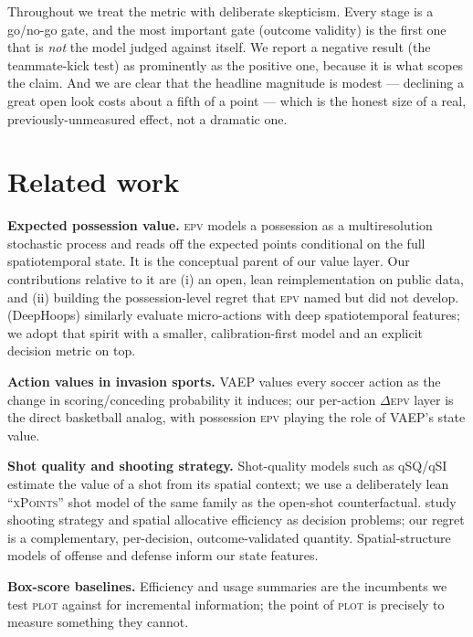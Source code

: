 \documentclass[11pt]{article}
\newcommand{\plot}{\textsc{plot}}
\newcommand{\epv}{\textsc{epv}}
\newcommand{\xpts}{\textsc{xPoints}}
\begin{document}
Throughout we treat the metric with deliberate skepticism. Every stage is a go/no-go gate, and the most
important gate (outcome validity) is the first one that is \emph{not} the model judged against itself.
We report a negative result (the teammate-kick test) as prominently as the positive one, because it is
what scopes the claim. And we are clear that the headline magnitude is modest --- declining a great open
look costs about a fifth of a point --- which is the honest size of a real, previously-unmeasured effect,
not a dramatic one.

\section{Related work}
\textbf{Expected possession value.} \epv{} \citep{cervone2016multiresolution} models a possession as a
multiresolution stochastic process and reads off the expected points conditional on the full
spatiotemporal state. It is the conceptual parent of our value layer. Our contributions relative to it
are (i) an open, lean reimplementation on public data, and (ii) building the possession-level regret
that \epv{} named but did not develop. \citet{sicilia2019deephoops} (DeepHoops) similarly evaluate
micro-actions with deep spatiotemporal features; we adopt that spirit with a smaller, calibration-first
model and an explicit decision metric on top.

\textbf{Action values in invasion sports.} VAEP \citep{decroos2019actions} values every soccer action as
the change in scoring/conceding probability it induces; our per-action $\Delta$\epv{} layer is the direct
basketball analog, with possession \epv{} playing the role of VAEP's state value.

\textbf{Shot quality and shooting strategy.} Shot-quality models such as qSQ/qSI
\citep{chang2014shotquality} estimate the value of a shot from its spatial context; we use a deliberately
lean ``\xpts{}'' shot model of the same family as the open-shot counterfactual. \citet{sandholtz2020markov,
sandholtz2020allocative} study shooting strategy and spatial allocative efficiency as decision problems;
our regret is a complementary, per-decision, outcome-validated quantity. Spatial-structure models of
offense and defense \citep{miller2014factorized,franks2015defense} inform our state features.

\textbf{Box-score baselines.} Efficiency and usage summaries \citep{kubatko2007starting} are the
incumbents we test \plot{} against for incremental information; the point of \plot{} is precisely to
measure something they cannot.
\end{document}
